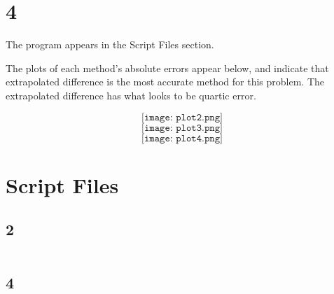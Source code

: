 \documentclass{article}
\begin{document}
\section*{4}
The program appears in the Script Files section.

The plots of each method's absolute errors appear below, and indicate that extrapolated difference is the most accurate method for this problem. The extrapolated difference has what looks to be quartic error.

\[\texttt{[image: plot2.png]}\]
\[\texttt{[image: plot3.png]}\]
\[\texttt{[image: plot4.png]}\]

\section*{Script Files}
\subsection*{2}
\begin{verbatim}

\end{verbatim}
\subsection*{4}
\begin{verbatim}

\end{verbatim}
\end{document}
